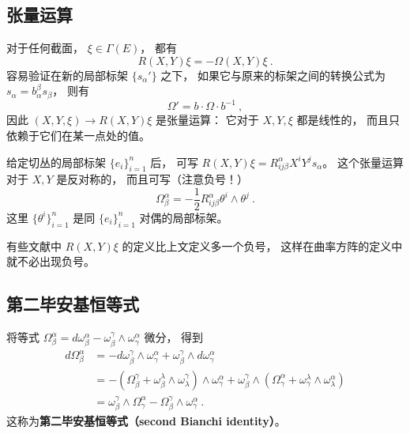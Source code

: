 \subsection{张量运算}
对于任何截面， $\xi\in\Gamma(E)$， 都有
$$
R(X,Y)\xi=-\Omega(X,Y)\xi~.
$$
容易验证在新的局部标架 $\{s_\alpha'\}$ 之下， 如果它与原来的标架之间的转换公式为 $s_\alpha=b_\alpha^\beta s_\beta$， 则有
$$
\Omega'=b\cdot\Omega \cdot b^{-1}~,
$$
因此 $(X,Y,\xi)\to R(X,Y)\xi$ 是张量运算： 它对于 $X,Y,\xi$ 都是线性的， 而且只依赖于它们在某一点处的值。 

给定切丛的局部标架 $\{e_i\}_{i=1}^n$ 后， 可写 $R(X,Y)\xi=R^\alpha_{ij\beta}X^iY^js_\alpha$。 这个张量运算对于 $X,Y$ 是反对称的， 而且可写（注意负号！）
$$
\Omega_\beta^\alpha=-\frac{1}{2}R^\alpha_{ij\beta}\theta^i\wedge\theta^j~.
$$
这里 $\{\theta^i\}_{i=1}^n$ 是同 $\{e_i\}_{i=1}^n$ 对偶的局部标架。

有些文献中 $R(X,Y)\xi$ 的定义比上文定义多一个负号， 这样在曲率方阵的定义中就不必出现负号。

\subsection{第二毕安基恒等式}
将等式 $\Omega_\beta^\alpha=d\omega_\beta^\alpha-\omega_\beta^\gamma\wedge\omega_\gamma^\alpha$ 微分， 得到
$$
\begin{aligned}
d\Omega_\beta^\alpha&=-d\omega_\beta^\gamma\wedge\omega_\gamma^\alpha+\omega_\beta^\gamma\wedge d\omega_\gamma^\alpha\\
&=-(\Omega_\beta^\gamma+\omega_\beta^\lambda\wedge\omega_\lambda^\gamma)\wedge\omega_\gamma^\alpha
+\omega_\beta^\gamma\wedge(\Omega_\gamma^\alpha+\omega_\gamma^\lambda\wedge\omega_\lambda^\alpha)\\
&=\omega_\beta^\gamma\wedge\Omega_\gamma^\alpha-\Omega_\beta^\gamma\wedge\omega_\gamma^\alpha~.
\end{aligned}
$$
这称为\textbf{第二毕安基恒等式（second Bianchi identity）}。
